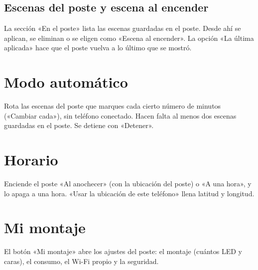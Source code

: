 
\subsection{Escenas del poste y escena al encender}
La sección «En el poste» lista las escenas guardadas en el poste. Desde ahí se aplican, se eliminan o se eligen como «Escena al encender». La opción «La última aplicada» hace que el poste vuelva a lo último que se mostró.


\section{Modo automático}

Rota las escenas del poste que marques cada cierto número de minutos («Cambiar cada»), sin teléfono conectado. Hacen falta al menos dos escenas guardadas en el poste. Se detiene con «Detener».


\section{Horario}

Enciende el poste «Al anochecer» (con la ubicación del poste) o «A una hora», y lo apaga a una hora. «Usar la ubicación de este teléfono» llena latitud y longitud.



\section{Mi montaje}

El botón «Mi montaje» abre los ajustes del poste: el montaje (cuántos LED y caras), el consumo, el Wi-Fi propio y la seguridad.


